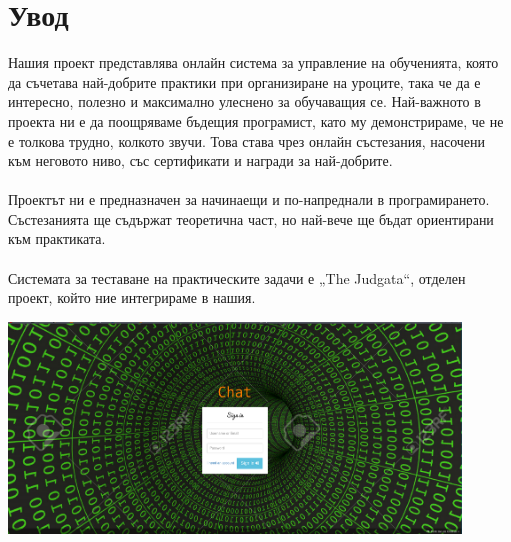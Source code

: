 \documentclass[12pt]{article}
\begin{document}
	\section{Увод}
	Нашия проект представлява онлайн система за управление на обученията, която да съчетава най-добрите практики при организиране на уроците, така че да е интересно, полезно и максимално улеснено за обучаващия се. Най-важното в проекта ни е да поощряваме бъдещия програмист, като му демонстрираме, че не е толкова трудно, колкото звучи. Това става чрез онлайн състезания, насочени към неговото ниво, със сертификати и награди за най-добрите. \\
	\\
	Проектът ни е предназначен за начинаещи и по-напреднали в програмирането. Състезанията ще съдържат теоретична част, но най-вече ще бъдат ориентирани към практиката. \\
	\\
	Системата за теставане на практическите задачи е „\foreignlanguage{english}{The Judgata}“, отделен проект, който ние интегрираме в нашия. \\\vspace{0.5cm}
	
	\includegraphics[width=0.9\textwidth]{chat} \\
	\newpage
\end{document}
